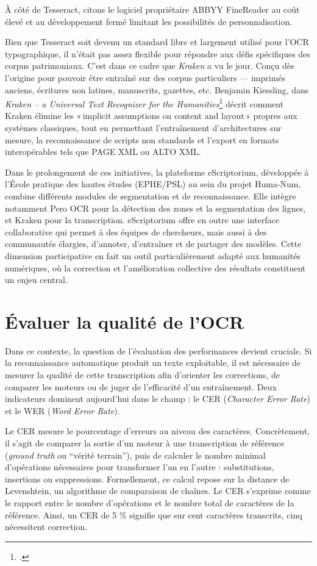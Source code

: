 À côté de Tesseract, citons le logiciel propriétaire ABBYY FineReader au coût élevé et au développement fermé limitant les possibilités de personnalisation.

Bien que Tesseract soit devenu un standard libre et largement utilisé pour l’OCR typographique, il n’était pas assez flexible pour répondre aux défis spécifiques des corpus patrimoniaux. C’est dans ce cadre que \emph{Kraken} a vu le jour. Conçu dès l’origine pour pouvoir être entraîné sur des corpus particuliers — imprimés anciens, écritures non latines, manuscrits, gazettes, etc. Benjamin Kiessling, dans \emph{Kraken – a Universal Text Recognizer for the Humanities}\footcite[][]{kiessling} décrit comment Kraken élimine les « implicit assumptions on content and layout » propres aux systèmes classiques, tout en permettant l’entraînement d’architectures sur mesure, la reconnaissance de scripts non standards et l’export en formats interopérables tels que PAGE XML ou ALTO XML.

Dans le prolongement de ces initiatives, la plateforme eScriptorium, développée à l’École pratique des hautes études (EPHE/PSL) au sein du projet Huma-Num, combine différents modules de segmentation et de reconnaissance. Elle intègre notamment Pero OCR pour la détection des zones et la segmentation des lignes, et Kraken pour la transcription. eScriptorium offre en outre une interface collaborative qui permet à des équipes de chercheurs, mais aussi à des communautés élargies, d’annoter, d’entraîner et de partager des modèles. Cette dimension participative en fait un outil particulièrement adapté aux humanités numériques, où la correction et l’amélioration collective des résultats constituent un enjeu central.

\section{Évaluer la qualité de l'OCR}

Dans ce contexte, la question de l’évaluation des performances devient cruciale. Si la reconnaissance automatique produit un texte exploitable, il est nécessaire de mesurer la qualité de cette transcription afin d’orienter les corrections, de comparer les moteurs ou de juger de l’efficacité d’un entraînement. Deux indicateurs dominent aujourd’hui dans le champ : le CER (\emph{Character Error Rate}) et le WER (\emph{Word Error Rate}).

Le CER mesure le pourcentage d’erreurs au niveau des caractères. Concrètement, il s’agit de comparer la sortie d’un moteur à une transcription de référence (\emph{ground truth} ou \enquote{vérité terrain}), puis de calculer le nombre minimal d’opérations nécessaires pour transformer l’un en l’autre : substitutions, insertions ou suppressions. Formellement, ce calcul repose sur la distance de Levenshtein, un algorithme de comparaison de chaînes. Le CER s’exprime comme le rapport entre le nombre d’opérations et le nombre total de caractères de la référence. Ainsi, un CER de 5 \% signifie que sur cent caractères transcrits, cinq nécessitent correction.

